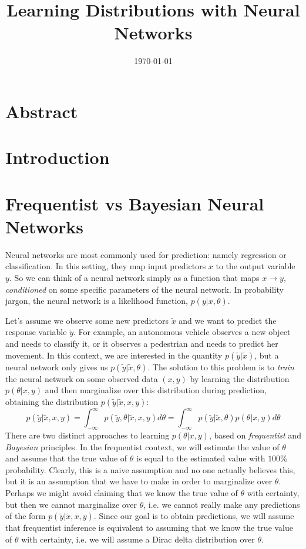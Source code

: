 \documentclass[12pt]{article}
\title{Learning Distributions with Neural Networks}
\author{}
\date{\today}
\begin{document}
\maketitle

\section{Abstract}

\section{Introduction}

\section{Frequentist vs Bayesian Neural Networks}

Neural networks are most commonly used for prediction: namely regression or classification. In this setting, they map input predictors $x$ to the output variable $y$. So we can think of a neural network simply as a function that maps $x \rightarrow y$, \textit{conditioned} on some specific parameters of the neural network. In probability jargon, the neural network is a likelihood function, $p(y | x, \theta)$.

Let's assume we observe some new predictors $\tilde{x}$ and we want to predict the response variable $\tilde{y}$. For example, an autonomous vehicle observes a new object and needs to classify it, or it observes a pedestrian and needs to predict her movement. In this context, we are interested in the quantity $p(\tilde{y} | \tilde{x})$, but a neural network only gives us $p(\tilde{y} | \tilde{x}, \theta)$. The solution to this problem is to \textit{train} the neural network on some observed data $(x, y)$ by learning the distribution $p(\theta | x, y)$ and then marginalize over this distribution during prediction, obtaining the distribution $p(\tilde{y} | \tilde{x}, x, y)$:
$$
p(\tilde{y} | \tilde{x}, x, y) = \int_{-\infty}^\infty p(\tilde{y}, \theta | \tilde{x}, x, y) d\theta =   \int_{-\infty}^\infty p(\tilde{y} | \tilde{x}, \theta) p(\theta | x, y) d\theta
$$
There are two distinct approaches to learning $p(\theta | x, y)$, based on \textit{frequentist} and \textit{Bayesian} principles. In the frequentist context, we will estimate the value of $\theta$ and assume that the true value of $\theta$ is equal to the estimated value with $100\%$ probability. Clearly, this is a naive assumption and no one actually believes this, but it is an assumption that we have to make in order to marginalize over $\theta$. Perhaps we might avoid claiming that we know the true value of $\theta$ with certainty, but then we cannot marginalize over $\theta$, i.e. we cannot really make any predictions of the form $p(\tilde{y} | \tilde{x}, x, y)$. Since our goal is to obtain predictions, we will assume that frequentist inference is equivalent to assuming that we know the true value of $\theta$ with certainty, i.e. we will assume a Dirac delta distribution over $\theta$.
\end{document}
